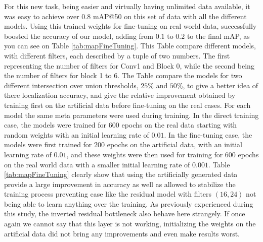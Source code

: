 For this new task, being easier and virtually having unlimited data available, it was easy to achieve over $0.8$ mAP@50 on this set of data with all the different models. Using this trained weights for fine-tuning on real world data, successfully boosted the accuracy of our model, adding from $0.1$ to $0.2$ to the final mAP, as you can see on Table \ref{tab:mapFineTuning}. This Table compare different models, with different filters, each described by a tuple of two numbers. The first representing the number of
filters for Conv1 and Block 0, while the second being the number of filters for block 1 to 6. The Table compare the models for two different intersection over union thresholds, $25\%$ and $50\%$, to give a better idea of there localization accuracy, and give the relative improvement obtained by training first on the artificial data before fine-tuning on the real cases. For each model the same meta parameters were used during training. In the direct training case, the models were trained for $600$ epochs on the real data starting with random weights with an initial learning rate of $0.01$. In the fine-tuning case, the models were first trained for $200$ epochs on the artificial data, with an initial learning rate of $0.01$, and these weights were then used for training for $600$ epochs on the real world data with a smaller initial learning rate of $0.001$. Table \ref{tab:mapFineTuning} clearly show that using the artificially generated data provide a large improvement in accuracy as well as allowed to stabilize the training process preventing case like the residual model with filters $(16,24)$ not being able to learn anything over the training. As previously experienced during this study, the inverted residual bottleneck also behave here strangely. If once again we cannot say that this layer is not working, initializing the weights on the artificial data did not bring any improvements and even make results worst.

